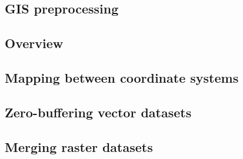 \begin{appendices}
  \section{GIS preprocessing}
  \subsection{Overview}%
  \label{app:preprocessing-overview}%
  
  \subsection{Mapping between coordinate systems}%
  \label{app:srid-change}
  
  \subsection{Zero-buffering vector datasets}%
  \label{app:zero-buffer}
  
  \subsection{Merging raster datasets}%
  \label{app:raster-merging}
  
\end{appendices}
